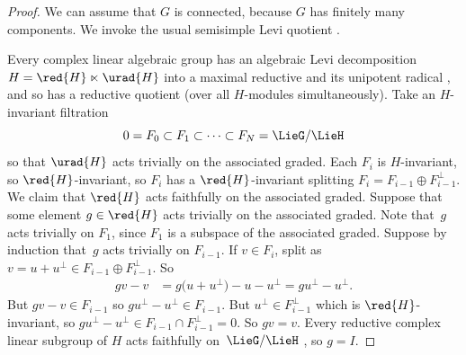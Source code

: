 \begin{proof}
We can assume that $G$ is connected, because $G$ has finitely many components.
We invoke the usual semisimple Levi quotient \cite[p. 20]{Vinberg:1994}.

Every complex linear algebraic group has an algebraic Levi decomposition $H = \red{H} \ltimes \urad{H}$ into a maximal reductive and its unipotent radical \cite[Theorem 4.3]{Hochschild:1981}, and so has a reductive quotient (over all $H$-modules simultaneously).
Take an $H$-invariant filtration \[0 = F_0 \subset F_1 \subset \cdots
 \subset F_N = \LieG/\LieH\] so that $\urad{H}$ acts trivially on the associated graded.
Each $F_i$ is $H$-invariant, so $\red{H}$-invariant, so $F_i$ has a $\red{H}$-invariant splitting $F_i=F_{i-1} \oplus F_{i-1}^{\perp}$.
We claim that $\red{H}$ acts faithfully on the associated graded.
Suppose that some element $g \in \red{H}$ acts trivially on the associated graded.
Note that~$g$ acts trivially on $F_1$, since $F_1$ is a subspace of the associated graded.
Suppose by induction that~$g$ acts trivially on $F_{i-1}$.
If $v \in F_i$, split as $v=u+u^{\perp}\in F_{i-1}\oplus F_{i-1}^{\perp}$.
So
\begin{align*}
gv-v
&=
g\bigl(u+u^{\perp}\bigr)-u-u^{\perp}=
gu^{\perp}-u^{\perp}.
\end{align*}
But $gv-v \in F_{i-1}$ so $gu^{\perp}-u^{\perp} \in F_{i-1}$.
But $u^{\perp} \in F_{i-1}^{\perp}$ which is $\red{H}$-invariant, so $gu^{\perp}-u^{\perp} \in F_{i-1} \cap F_{i-1}^{\perp}=0$.
So $gv = v$.
Every reductive complex linear subgroup of $H$ acts faithfully on~$\LieG/\LieH$ \cite[Lemma~6.1]{McKay2013}, so $g = I$.
\end{proof}

